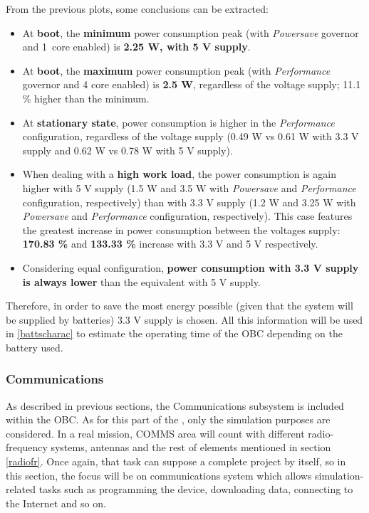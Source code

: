From the previous plots, some conclusions can be extracted:

\begin{itemize} [topsep=0pt]
	
	\item At \textbf{boot}, the \textbf{minimum} power consumption peak (with \textit{Powersave} governor and 1~core enabled) is \textbf{2.25 W, with 5 V supply}.
	\item At \textbf{boot}, the \textbf{maximum} power consumption peak (with \textit{Performance} governor and 4 core enabled) is \textbf{2.5 W}, regardless of the voltage supply; 11.1 \% higher than the minimum.
	\item At \textbf{stationary state}, power consumption is higher in the \textit{Performance} configuration, regardless of the voltage supply (0.49 W vs 0.61 W with 3.3 V supply and 0.62 W vs 0.78 W with 5 V supply).
	\item When dealing with a \textbf{high work load}, the power consumption is again higher with 5 V supply (1.5 W and 3.5 W with \textit{Powersave} and \textit{Performance} configuration, respectively) than with 3.3 V supply (1.2 W and 3.25 W with \textit{Powersave} and \textit{Performance} configuration, respectively). This case features the greatest increase in power consumption between the voltages supply: \textbf{170.83 \%} and \textbf{133.33 \%} increase with 3.3 V and 5 V respectively.
	\item Considering equal configuration, \textbf{power consumption with 3.3 V supply is always lower} than the equivalent with 5 V supply.
	
\end{itemize}

Therefore, in order to save the most energy possible (given that the system will be supplied by batteries) 3.3 V supply is chosen. All this information will be used in \ref{battscharac} to estimate the operating time of the \acrshort{OBC} depending on the battery used.


\subsubsection{Communications}

As described in previous sections, the Communications subsystem is included within the \acrshort{OBC}. As for this part of the , only the simulation purposes are considered. In a real mission, COMMS area will count with different radio-frequency systems, antennas and the rest of elements mentioned in section \ref{radiofr}. Once  again, that task can suppose a complete project by itself, so in this section, the focus will be on communications system which allows simulation-related tasks such as programming the device, downloading data, connecting to the Internet and so on.
